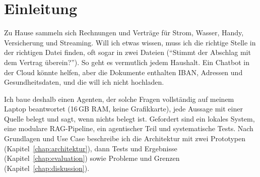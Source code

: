 
\chapter{Einleitung}
\label{chap:einleitung}

Zu Hause sammeln sich Rechnungen und Verträge für Strom, Wasser, Handy, Versicherung und Streaming. Will ich etwas wissen, muss ich die richtige Stelle in der richtigen Datei finden, oft sogar in zwei Dateien (\enquote{Stimmt der Abschlag mit dem Vertrag überein?}). So geht es vermutlich jedem Haushalt. Ein Chatbot in der Cloud könnte helfen, aber die Dokumente enthalten IBAN, Adressen und Gesundheitsdaten, und die will ich nicht hochladen.

Ich baue deshalb einen Agenten, der solche Fragen vollständig auf meinem Laptop beantwortet (16\,GB RAM, keine Grafikkarte), jede Aussage mit einer Quelle belegt und sagt, wenn nichts belegt ist. Gefordert sind ein lokales System, eine modulare RAG-Pipeline, ein agentischer Teil und systematische Tests. Nach Grundlagen und Use Case beschreibe ich die Architektur mit zwei Prototypen (Kapitel~\ref{chap:architektur}), dann Tests und Ergebnisse (Kapitel~\ref{chap:evaluation}) sowie Probleme und Grenzen (Kapitel~\ref{chap:diskussion}).
